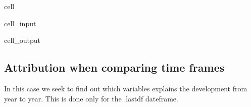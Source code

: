 \documentclass[letterpaper,10pt,english]{jupyterBook}
\begin{document}
\begin{sphinxuseclass}{cell}\begin{sphinxVerbatimInput}

\begin{sphinxuseclass}{cell_input}
\begin{sphinxVerbatim}[commandchars=\\\{\}]
 
\end{sphinxVerbatim}

\end{sphinxuseclass}\end{sphinxVerbatimInput}
\begin{sphinxVerbatimOutput}

\begin{sphinxuseclass}{cell_output}
\noindent{}

\end{sphinxuseclass}\end{sphinxVerbatimOutput}

\end{sphinxuseclass}

\subsection{Attribution when comparing time frames}
\label{\detokenize{content/howto/attribution/Attribution background:attribution-when-comparing-time-frames}}
\sphinxAtStartPar
In this case we seek to find out which variables explains the development from year to year. This is done only for the .lastdf dateframe.
\end{document}
